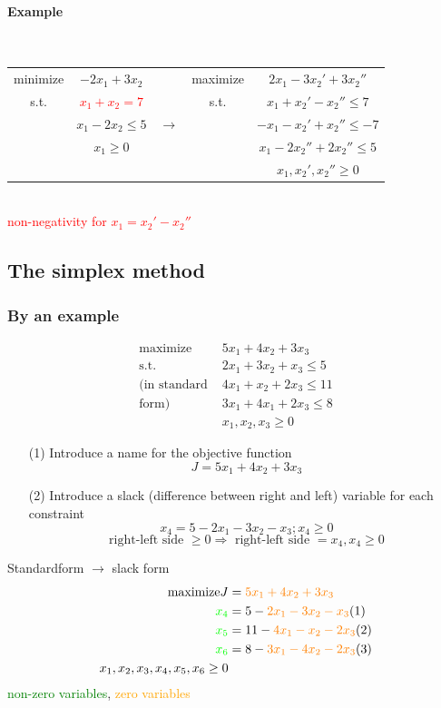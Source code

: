 \paragraph{Example} ~ \\
\begin{tabular}{ccccc}
minimize& $-2x_1+3x_2$ && maximize &$2x_1-3x_2'+3x_2''$ \\
s.t. & \textcolor{red}{$x_1+x_2 = 7$} && s.t. & $x_1+x_2'-x_2'' \leq 7$ \\
& $x_1-2x_2 \leq 5$ & $\rightarrow$ && $-x_1-x_2'+x_2'' \leq -7$ \\
& $x_1 \geq 0$ &&& $x_1-2x_2''+2x_2'' \leq 5$ \\
&&&& $x_1,x_2',x_2'' \geq 0$ \\
\end{tabular} \\
\textcolor{red}{non-negativity for $x_1=x_2'-x_2''$}

\subsection{The simplex method}

\subsubsection{By an example}
\begin{align*}
\text{maximize } & 5x_1+4x_2+3x_3 \\
\text{s.t. } & 2x_1+3x_2+x_3 \leq 5 \\
\text{(in standard }  & 4x_1 + x_2 + 2x_3 \leq 11 \\
\text{form) } & 3x_1 + 4x_1 + 2x_3 \leq 8 \\
& x_1,x_2,x_3 \geq 0
\end{align*}
\begin{itemize}
\item[(1)] Introduce a name for the objective function 
$$J = 5x_1+4x_2+3x_3$$
\item[(2)] Introduce a slack (difference between right and left) variable for each constraint
$$x_4 = 5-2x_1-3x_2-x_3 ; x_4 \geq 0$$
$$\text{right-left side $\geq 0 \Rightarrow$ right-left side $=x_4, x_4 \geq 0$}$$
\end{itemize}
Standardform $\rightarrow$ slack form
\begin{align*}
\text{maximize} J &= \textcolor{orange}{5x_1 + 4x_2 + 3x_3} \\
\textcolor{green}{x_4} &= 5-\textcolor{orange}{2x_1-3x_2-x_3} (1) \\ 
\textcolor{green}{x_5} &= 11-\textcolor{orange}{4x_1-x_2-2x_3}  (2) \\
\textcolor{green}{x_6} &= 8-\textcolor{orange}{3x_1-4x_2-2x_3}  (3) \\
x_1,x_2,x_3,x_4,x_5,x_6 \geq 0
\end{align*}
\textcolor{green}{non-zero variables}, \textcolor{orange}{zero variables}
